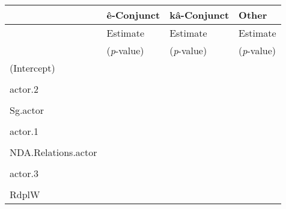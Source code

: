                 \begin{table}[H]
                \centering
                \begin{tabular}{llll}
                \toprule
                            & \textbf{ê-Conjunct}   & \textbf{kâ-Conjunct}  & \textbf{Other} \\
                                            \midrule
                            & Estimate     & Estimate     & Estimate\\
                            & (\textit{p}-value) & (\textit{p}-value) & (\textit{p}-value) \\
                \midrule
                
(Intercept)         & \cellcolor[HTML]{B6D7A8}{0.923}  & \cellcolor[HTML]{EA9999}{-1.342} & \cellcolor[HTML]{EA9999}{-3.052} \\
                    & \cellcolor[HTML]{B6D7A8}{($<$ 0.001)}      & \cellcolor[HTML]{EA9999}{($<$ 0.001)}      & \cellcolor[HTML]{EA9999}{($<$ 0.001)}      \\
actor.2             & \cellcolor[HTML]{EA9999}{-1.147} &        & \cellcolor[HTML]{B6D7A8}{1.849}  \\
                    & \cellcolor[HTML]{EA9999}{($<$ 0.001)}      &        & \cellcolor[HTML]{B6D7A8}{($<$ 0.001)}      \\
Sg.actor            & \cellcolor[HTML]{EA9999}{-0.695} & \cellcolor[HTML]{B6D7A8}{0.633}  &        \\
                    & \cellcolor[HTML]{EA9999}{(0.001)}  & \cellcolor[HTML]{B6D7A8}{(0.004)}  &        \\
actor.1             & \cellcolor[HTML]{B6D7A8}{0.471}  & \cellcolor[HTML]{EA9999}{-0.553} &        \\
                    & \cellcolor[HTML]{B6D7A8}{($<$ 0.001)}      & \cellcolor[HTML]{EA9999}{($<$ 0.001)}      &        \\
NDA.Relations.actor & \cellcolor[HTML]{B6D7A8}{0.561}  &        & \cellcolor[HTML]{EA9999}{-2.744} \\
                    & \cellcolor[HTML]{B6D7A8}{(0.028)}  &        & \cellcolor[HTML]{EA9999}{(0.01)}   \\
actor.3             & \cellcolor[HTML]{B6D7A8}{0.563}  & \cellcolor[HTML]{EA9999}{-0.653} &        \\
                    & \cellcolor[HTML]{B6D7A8}{($<$ 0.001)}      & \cellcolor[HTML]{EA9999}{($<$ 0.001)}      &        \\
RdplW               & \cellcolor[HTML]{B6D7A8}{0.616}  &        &        \\

\end{tabular}
\end{table}
